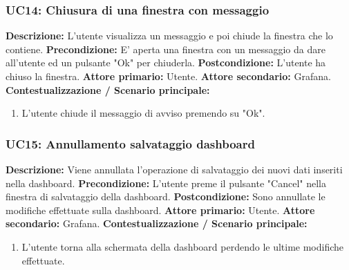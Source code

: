                 \subsubsection{UC14: Chiusura di una finestra con messaggio}
                    \textbf{Descrizione:} L'utente visualizza un messaggio e poi chiude la finestra che lo contiene.
                    \newline
                    \textbf{Precondizione:} E' aperta una finestra con un messaggio da dare all'utente ed un pulsante "Ok" per chiuderla.
                    \newline
                    \textbf{Postcondizione:} L'utente ha chiuso la finestra.
                    \newline
                    \textbf{Attore primario:} Utente.
                    \newline
                    \textbf{Attore secondario:} Grafana.
                    \newline
                    \textbf{Contestualizzazione / Scenario principale:} \begin{enumerate}
                            \item L'utente chiude il messaggio di avviso premendo su "Ok".
                        \end{enumerate}
                        
                \subsubsection{UC15: Annullamento salvataggio dashboard}
                    \textbf{Descrizione:} Viene annullata l'operazione di salvataggio dei nuovi dati inseriti nella dashboard.
                    \newline
                    \textbf{Precondizione:} L'utente preme il pulsante "Cancel" nella finestra di salvataggio della dashboard. 
                    \newline
                    \textbf{Postcondizione:} Sono annullate le modifiche effettuate sulla dashboard.
                    \newline
                    \textbf{Attore primario:} Utente.
                    \newline
                    \textbf{Attore secondario:} Grafana.
                    \newline
                    \textbf{Contestualizzazione / Scenario principale:} \begin{enumerate}
                            \item L'utente torna alla schermata della dashboard perdendo le ultime modifiche effettuate.
                        \end{enumerate}
                        
